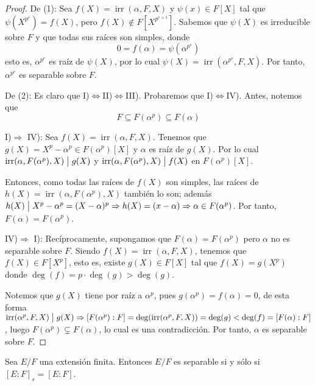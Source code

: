 \documentclass[12pt]{report}
\theoremstyle{largebreak}
\newcommand\divides{\ensuremath{\bigm|}}
\DeclareMathOperator{\irr}{irr}
\begin{document}
    \begin{proof}
        De (1): Sea $f(X)=\irr(\alpha,F,X)$ y $\psi(x)\in F[X]$ tal que $\psi(X^{p^e})=f(X)$, pero $f(X)\notin F[X^{p^{e+1}}]$. Sabemos que $\psi(X)$ es irreducible sobre $F$ y que todas sus raíces son simples, donde
        \begin{equation*}
            0=f(\alpha)=\psi(\alpha^{p^e})
        \end{equation*}
        esto es, $\alpha^{p^e}$ es raíz de $\psi(X)$, por lo cual $\psi(X)=\irr(\alpha^{p^e},F,X)$. Por tanto, $\alpha^{p^e}$ es separable sobre $F$.

        De (2): Es claro que I)$\iff$II)$\iff$III). Probaremos que I)$\iff$IV). Antes, notemos que
        \begin{equation*}
            F\subseteq F(\alpha^p)\subseteq F(\alpha)
        \end{equation*}
        
        I)$\Rightarrow$ IV): Sea $f(X)=\irr(\alpha, F, X)$. Tenemos que $g(X)=X^p-\alpha^p\in F(\alpha^p)[X]$ y $\alpha$ es raíz de $g(X)$. Por lo cual $\irr(\alpha,F(\alpha^p),X)\divides g(X)$ y $\irr(\alpha,F(\alpha^p),X)
        \divides f(X)$ en $F(\alpha^p)[X]$.

        Entonces, como todas las raíces de $f(X)$ son simples, las raíces de $h(X)=\irr(\alpha,F(\alpha^p),X)$ también lo son; además $h(X)\divides X^p-\alpha^p=(X-\alpha)^p\Rightarrow h(X)=(x-\alpha)\Rightarrow \alpha\in F(\alpha^p)$. Por tanto, $F(\alpha)=F(\alpha^p)$.

        IV)$\Rightarrow$ I): Recíprocamente, supongamos que $F(\alpha)=F(\alpha^p)$ pero $\alpha$ no es separable sobre $F$. Siendo $f(X)=\irr(\alpha,F,X)$, tenemos que $f(X)\in F[X^p]$, esto es, existe $g(X)\in F[X]$ tal que $f(X)=g(X^p)$ donde $\deg(f)=p\cdot\deg(g)>\deg(g)$.
        
        Notemos que $g(X)$ tiene por raíz a $\alpha^p$, pues $g(\alpha^p)=f(\alpha)=0$, de esta forma $\irr(\alpha^p,F,X)\divides g(X)\Rightarrow [F(\alpha^p):F]=\deg(\irr(\alpha^p,F,X))=\deg(g)<\deg(f)=[F(\alpha):F]$, luego $F(\alpha^p)\subsetneq F(\alpha)$, lo cual es una contradicción. Por tanto, $\alpha$ es separable sobre $F$.

    \end{proof}

    \begin{propo}
        Sea $E/F$ una extensión finita. Entonces $E/F$ es separable si y sólo si $\left[E:F\right]_s=\left[E:F\right]$.
    \end{propo}
\end{document}
